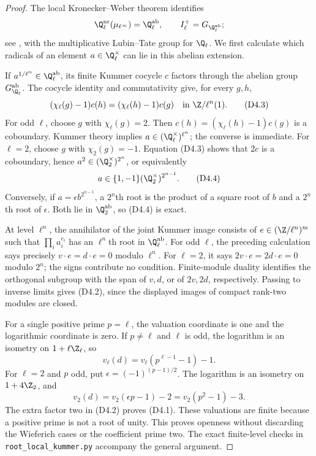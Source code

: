 \begin{proof}
The local Kronecker--Weber theorem identifies
\[
 \Q_\ell^{\mathrm{nr}}(\mu_{\ell^\infty})
   =\Q_\ell^{\mathrm{ab}},
 \qquad I_\ell^+=G_{\Q_\ell^{\mathrm{ab}}};
\]
see \citet[I, Theorem 4.8 and Corollary 4.12]{BMilneCFT2020},
with the multiplicative Lubin--Tate group for $\Q_\ell$.
We first calculate which radicals of an element $a\in\Q_\ell^\times$
can lie in this abelian extension.

If $a^{1/\ell^n}\in\Q_\ell^{\mathrm{ab}}$, its finite Kummer cocycle
$c$ factors through the abelian group $G_{\Q_\ell}^{\mathrm{ab}}$.
The cocycle identity and commutativity give, for every $g,h$,
\[
 (\chi_\ell(g)-1)c(h)=(\chi_\ell(h)-1)c(g)
 \quad\text{in }\Z/\ell^n(1).
\tag{D4.3}
\]
For odd $\ell$, choose $g$ with $\chi_\ell(g)=2$.
Then $c(h)=(\chi_\ell(h)-1)c(g)$ is a coboundary. Kummer theory
implies $a\in(\Q_\ell^\times)^{\ell^n}$; the converse is immediate.
For $\ell=2$, choose $g$ with $\chi_2(g)=-1$. Equation (D4.3)
shows that $2c$ is a coboundary, hence
$a^2\in(\Q_2^\times)^{2^n}$, or equivalently
\[
 a\in\{1,-1\}(\Q_2^\times)^{2^{n-1}}.
\tag{D4.4}
\]
Conversely, if $a=\epsilon b^{2^{n-1}}$, a $2^n$th root is the
product of a square root of $b$ and a $2^n$th root of $\epsilon$.
Both lie in $\Q_2^{\mathrm{ab}}$, so (D4.4) is exact.

At level $\ell^n$, the annihilator of the joint Kummer image consists
of $e\in(\Z/\ell^n)^m$ such that
$\prod_i a_i^{e_i}$ has an $\ell^n$th root in
$\Q_\ell^{\mathrm{ab}}$. For odd $\ell$, the preceding calculation
says precisely $v\cdot e=d\cdot e=0$ modulo $\ell^n$.
For $\ell=2$, it says $2v\cdot e=2d\cdot e=0$ modulo $2^n$;
the signs contribute no condition. Finite-module duality identifies
the orthogonal subgroup with the span of $v,d$, or of $2v,2d$,
respectively. Passing to inverse limits gives (D4.2), since the
displayed images of compact rank-two modules are closed.

For a single positive prime $p=\ell$, the valuation coordinate is
one and the logarithmic coordinate is zero. If $p\ne\ell$ and
$\ell$ is odd, the logarithm is an isometry on $1+\ell\Z_\ell$, so
\[
 v_\ell(d)=v_\ell(p^{\ell-1}-1)-1.
\]
For $\ell=2$ and $p$ odd, put $\epsilon=(-1)^{(p-1)/2}$.
The logarithm is an isometry on $1+4\Z_2$, and
\[
 v_2(d)=v_2(\epsilon p-1)-2=v_2(p^2-1)-3.
\]
The extra factor two in (D4.2) proves (D4.1). These valuations are
finite because a positive prime is not a root of unity. This proves
openness without discarding the Wieferich cases or the coefficient
prime two. The exact finite-level checks in
\texttt{root\_local\_kummer.py} accompany the general argument.
\end{proof}
